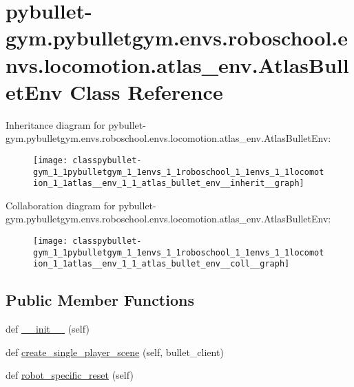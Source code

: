 \hypertarget{classpybullet-gym_1_1pybulletgym_1_1envs_1_1roboschool_1_1envs_1_1locomotion_1_1atlas__env_1_1_atlas_bullet_env}{}\section{pybullet-\/gym.pybulletgym.\+envs.\+roboschool.\+envs.\+locomotion.\+atlas\+\_\+env.\+Atlas\+Bullet\+Env Class Reference}
\label{classpybullet-gym_1_1pybulletgym_1_1envs_1_1roboschool_1_1envs_1_1locomotion_1_1atlas__env_1_1_atlas_bullet_env}


Inheritance diagram for pybullet-\/gym.pybulletgym.\+envs.\+roboschool.\+envs.\+locomotion.\+atlas\+\_\+env.\+Atlas\+Bullet\+Env\+:
\nopagebreak
\begin{figure}[H]
\begin{center}
\leavevmode
\texttt{[image: classpybullet-gym\_1\_1pybulletgym\_1\_1envs\_1\_1roboschool\_1\_1envs\_1\_1locomotion\_1\_1atlas\_\_env\_1\_1\_atlas\_bullet\_env\_\_inherit\_\_graph]}
\end{center}
\end{figure}


Collaboration diagram for pybullet-\/gym.pybulletgym.\+envs.\+roboschool.\+envs.\+locomotion.\+atlas\+\_\+env.\+Atlas\+Bullet\+Env\+:
\nopagebreak
\begin{figure}[H]
\begin{center}
\leavevmode
\texttt{[image: classpybullet-gym\_1\_1pybulletgym\_1\_1envs\_1\_1roboschool\_1\_1envs\_1\_1locomotion\_1\_1atlas\_\_env\_1\_1\_atlas\_bullet\_env\_\_coll\_\_graph]}
\end{center}
\end{figure}
\subsection*{Public Member Functions}
\begin{DoxyCompactItemize}
\item 
def \hyperlink{classpybullet-gym_1_1pybulletgym_1_1envs_1_1roboschool_1_1envs_1_1locomotion_1_1atlas__env_1_1_atlas_bullet_env_aea194f150013a4cde9155580e31e9d00}{\+\_\+\+\_\+init\+\_\+\+\_\+} (self)
\item 
def \hyperlink{classpybullet-gym_1_1pybulletgym_1_1envs_1_1roboschool_1_1envs_1_1locomotion_1_1atlas__env_1_1_atlas_bullet_env_af4dd2bf18c29262c07bef566b866386d}{create\+\_\+single\+\_\+player\+\_\+scene} (self, bullet\+\_\+client)
\item 
def \hyperlink{classpybullet-gym_1_1pybulletgym_1_1envs_1_1roboschool_1_1envs_1_1locomotion_1_1atlas__env_1_1_atlas_bullet_env_a31ea0c3a51d920ad32d8b99b08f22f9a}{robot\+\_\+specific\+\_\+reset} (self)
\end{DoxyCompactItemize}
